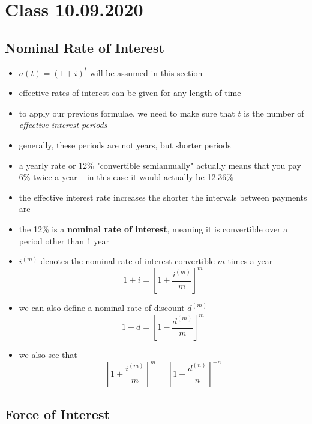 \documentclass[../00_main.tex]{subfiles}
\begin{document}
\section{Class 10.09.2020}

\subsection{Nominal Rate of Interest}

\begin{itemize}
    \item $a(t) = (1+i)^t$ will be assumed in this section
    \item effective rates of interest can be given for any length of time
    \item to apply our previous formulae, we need to make sure that $t$ is the
        number of \textit{effective interest periods}
    \item generally, these periods are not years, but shorter periods
    \item a yearly rate or 12\% "convertible semiannually" actually means that
        you pay 6\% twice a year -- in this case it would actually be 12.36\%
    \item the effective interest rate increases the shorter the intervals
        between payments are
    \item the 12\% is a \textbf{nominal rate of interest}, meaning it is
        convertible over a period other than 1 year
    \item $i^{(m)}$ denotes the nominal rate of interest convertible $m$ times
        a year
        \begin{equation}\nonumber
            1+i = \left[ 1 + \frac{i^{(m)}}{m} \right]^m
        \end{equation}
    \item we can also define a nominal rate of discount $d^{(m)}$
        \begin{equation}\nonumber
            1-d = \left[ 1 - \frac{d^{(m)}}{m} \right]^m
        \end{equation}
    \item we also see that
        \begin{equation}\nonumber
            \left[ 1 + \frac{i^{(m)}}{m} \right]^m = 
                \left[ 1 - \frac{d^{(n)}}{n} \right]^{-n}
        \end{equation}
\end{itemize}

\subsection{Force of Interest}
\end{document}
